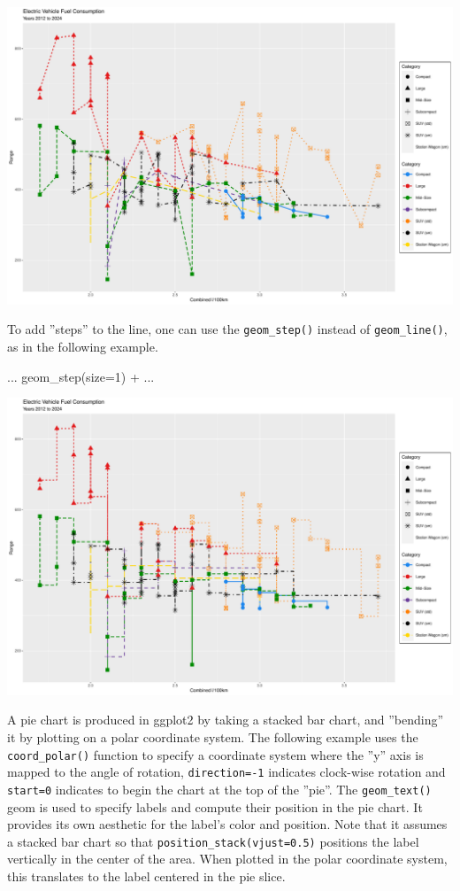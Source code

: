 \begin{center}
  \includegraphics[width=.8\textwidth]{fuel.linesPoints.pdf}
\end{center}

To add ''steps'' to the line, one can use the \texttt{geom\_step()} instead of \texttt{geom\_line()}, as in the following example.

\begin{samepage}
\begin{Rcode}
...
     geom_step(size=1) + 
... 
\end{Rcode}
\end{samepage}

\begin{center}
  \includegraphics[width=.8\textwidth]{fuel.steps.pdf}
\end{center}

A pie chart is produced in ggplot2 by taking a stacked bar chart, and ''bending'' it by plotting on a polar coordinate system. The following example uses the \texttt{coord\_polar()} function to specify a coordinate system where the ''y'' axis is mapped to the angle of rotation, \texttt{direction=-1} indicates clock-wise rotation and \texttt{start=0} indicates to begin the chart at the top of the ''pie''. The \texttt{geom\_text()} geom is used to specify labels and compute their position in the pie chart. It provides its own aesthetic for the label's color and position. Note that it assumes a stacked bar chart so that \texttt{position\_stack(vjust=0.5)} positions the label vertically in the center of the area. When plotted in the polar coordinate system, this translates to the label centered in the pie slice. 

